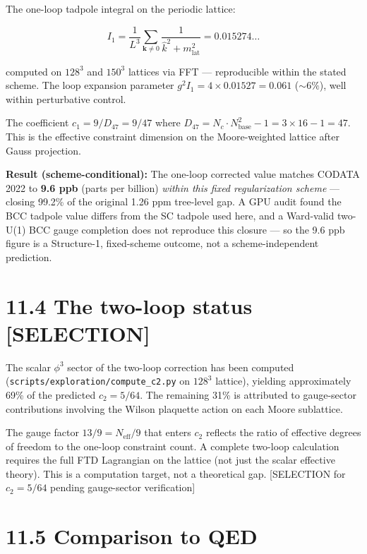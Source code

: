 \documentclass[
  11pt,
  letterpaper,
  twoside,
  openright]{book}
\begin{document}
The one-loop tadpole integral on the periodic lattice:

\[
I_1 = \frac{1}{L^3} \sum_{\mathbf{k} \neq 0} \frac{1}{\hat{k}^2 + m^2_{\text{lat}}} = 0.015274\ldots
\tag{11.3}
\]

computed on \(128^3\) and \(150^3\) lattices via FFT --- reproducible
within the stated scheme. The loop expansion parameter
\(g^2 I_1 = 4 \times 0.01527 = 0.061\) (\(\sim 6\%\)), well within
perturbative control.

The coefficient \(c_1 = 9/D_{47} = 9/47\) where
\(D_{47} = N_c \cdot N_{\text{base}}^2 - 1 = 3 \times 16 - 1 = 47\).
This is the effective constraint dimension on the Moore-weighted lattice
after Gauss projection.

\textbf{Result (scheme-conditional):} The one-loop corrected value
matches CODATA 2022 to \textbf{9.6 ppb} (parts per billion) \emph{within
this fixed regularization scheme} --- closing 99.2\% of the original
1.26 ppm tree-level gap. A GPU audit found the BCC tadpole value differs
from the SC tadpole used here, and a Ward-valid two-U(1) BCC gauge
completion does not reproduce this closure --- so the 9.6 ppb figure is
a Structure-1, fixed-scheme outcome, not a scheme-independent
prediction.

\section{11.4 The two-loop status
{[}SELECTION{]}}\label{the-two-loop-status-selection}

The scalar \(\phi^3\) sector of the two-loop correction has been
computed (\texttt{scripts/exploration/compute\_c2.py} on \(128^3\)
lattice), yielding approximately 69\% of the predicted \(c_2 = 5/64\).
The remaining 31\% is attributed to gauge-sector contributions involving
the Wilson plaquette action on each Moore sublattice.

The gauge factor \(13/9 = N_{\text{eff}}/9\) that enters \(c_2\)
reflects the ratio of effective degrees of freedom to the one-loop
constraint count. A complete two-loop calculation requires the full FTD
Lagrangian on the lattice (not just the scalar effective theory). This
is a computation target, not a theoretical gap. {[}SELECTION for
\(c_2 = 5/64\) pending gauge-sector verification{]}

\section{11.5 Comparison to QED}\label{comparison-to-qed}
\end{document}
